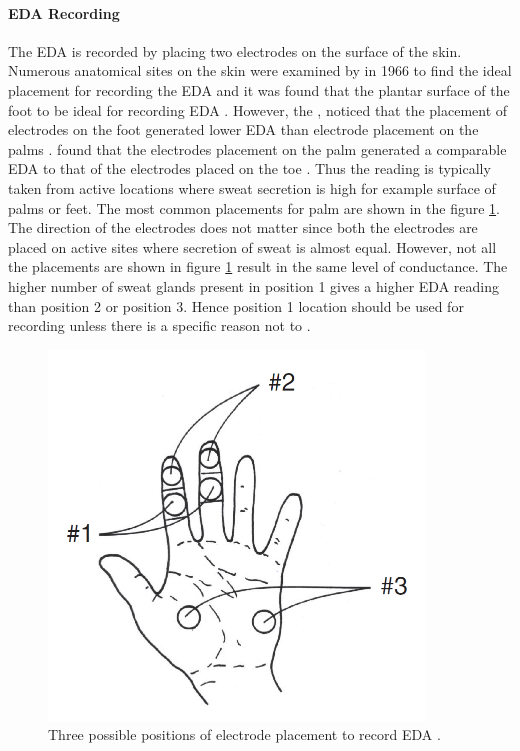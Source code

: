 \paragraph{EDA Recording} The EDA is recorded by placing two electrodes on the surface of the skin. Numerous anatomical sites on the skin were examined by \citeauthor{culp_regional_1966} in 1966 to find the ideal placement for recording the EDA and it was found that the plantar surface of the foot to be ideal for recording EDA \cite{culp_regional_1966}. However, the \citeauthor{van_dooren_emotional_2012}, noticed that the placement of electrodes on the foot generated lower EDA than electrode placement on the palms \cite{van_dooren_emotional_2012}. \citeauthor{payne_lapses_2016} found that the electrodes placement on the palm generated a comparable EDA to that of the  electrodes placed on the toe \cite{payne_lapses_2016}. Thus the reading is typically taken from active locations where sweat secretion is high for example surface of palms or feet. The most common placements for palm are shown in the figure \ref{fig:eda_electrode_placement}. The direction of the electrodes does not matter since both the electrodes are placed on active sites where secretion of sweat is almost equal. However, not all the placements are shown in figure \ref{fig:eda_electrode_placement} result in the same level of conductance. The higher number of sweat glands present in position 1 gives a higher EDA reading than position 2 or position 3. Hence position 1 location should be used for recording unless there is a specific reason not to \cite{cacioppo_electrodermal_2016_p_217_243}.

\begin{figure}
    \centering
    \includegraphics[width=100mm]{Figures/eda_electrode_placement.PNG}
    \caption{Three possible positions of electrode placement to record EDA \cite{cacioppo_electrodermal_2016_p_217_243}.}
    \label{fig:eda_electrode_placement}
\end{figure}

